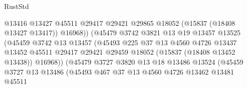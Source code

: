\begin{lexlean}{RustStd}
\begin{coremodule}
                                        @13416
                                        @13427
                                        @45511
                                        @29417
                                        @29421
                                        @29865
                                        @18052
                                        (@15837 (@18408 @13427 @13417))
                                        @16968))
                                    (@45479
                                      @3742
                                      @3821
                                      @13
                                      @19
                                      @13457
                                      @13525
                                      (@45459
                                        @3742
                                        @13
                                        @13457
                                        (@45493
                                          @225
                                          @37
                                          @13
                                          @4560
                                          @4726
                                          @13437
                                          @13452
                                          @45511
                                          @29417
                                          @29421
                                          @29459
                                          @18052
                                          (@15837 (@18408 @13452 @13438))
                                          @16968))
                                      (@45479
                                        @3727
                                        @3820
                                        @13
                                        @18
                                        @13486
                                        @13524
                                        (@45459
                                          @3727
                                          @13
                                          @13486
                                          (@45493
                                            @467
                                            @37
                                            @13
                                            @4560
                                            @4726
                                            @13462
                                            @13481
                                            @45511

\end{coremodule}
\end{lexlean}
